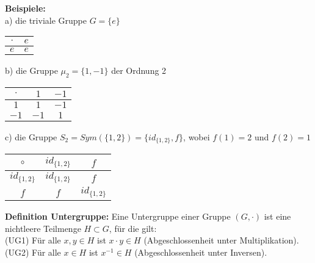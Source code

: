 \documentclass[11pt]{article}
\begin{document}
		\textbf{Beispiele:} \\
		a) die triviale Gruppe $G=\{e\}$
		\begin{center}
			\begin{tabular}{|c|c|}
				\hline
				$\cdot$ & $e$\\
				\hline
				$e$ & $e$ \\
				\hline
			\end{tabular}
		\end{center}
		b) die Gruppe $\mu_2 = \{1,-1\}$ der Ordnung 2
		\begin{center}
			\begin{tabular}{|c|c|c|}
				\hline
				$\cdot$ & $1$ & $-1$\\
				\hline
				$1$ & $1$ & $-1$ \\
				\hline
				$-1$ & $-1$ & $1$ \\
				\hline
			\end{tabular}
		\end{center}
		c) die Gruppe $S_2= Sym(\{1,2\}) = \{id_{\{1,2\}},f\}$, wobei $f(1)=2$ und $f(2)=1$
		\begin{center}
			\begin{tabular}{|c|c|c|}
				\hline
				$\circ$ & $id_{\{1,2\}}$ & $f$\\
				\hline
				$id_{\{1,2\}}$ & $id_{\{1,2\}}$ & $f$ \\
				\hline
				$f$ & $f$ & $id_{\{1,2\}}$ \\
				\hline
			\end{tabular}
		\end{center}
		
		\begin{mdframed}[backgroundcolor=blue!20]
			\textbf{Definition Untergruppe:} Eine Untergruppe einer Gruppe $(G,\cdot)$ ist eine 
			nichtleere Teilmenge $H \subset G$, f\"ur die gilt: \\
			(UG1) F\"ur alle $x,y \in H$ ist $x \cdot y \in H$ (Abgeschlossenheit unter Multiplikation). \\
			(UG2) F\"ur alle $x \in H$ ist $x^{-1} \in H$ (Abgeschlossenheit unter Inversen).
		\end{mdframed}
		
\end{document}
